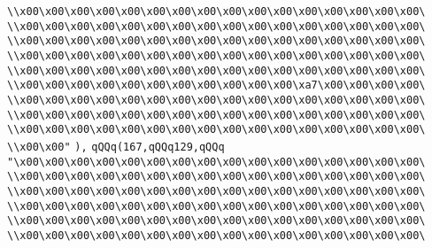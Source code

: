 \verb|\\x00\x00\x00\x00\x00\x00\x00\x00\x00\x00\x00\x00\x00\x00\x00\x00\|\newline
\verb|\\x00\x00\x00\x00\x00\x00\x00\x00\x00\x00\x00\x00\x00\x00\x00\x00\|\newline
\verb|\\x00\x00\x00\x00\x00\x00\x00\x00\x00\x00\x00\x00\x00\x00\x00\x00\|\newline
\verb|\\x00\x00\x00\x00\x00\x00\x00\x00\x00\x00\x00\x00\x00\x00\x00\x00\|\newline
\verb|\\x00\x00\x00\x00\x00\x00\x00\x00\x00\x00\x00\x00\x00\x00\x00\x00\|\newline
\verb|\\x00\x00\x00\x00\x00\x00\x00\x00\x00\x00\x00\xa7\x00\x00\x00\x00\|\newline
\verb|\\x00\x00\x00\x00\x00\x00\x00\x00\x00\x00\x00\x00\x00\x00\x00\x00\|\newline
\verb|\\x00\x00\x00\x00\x00\x00\x00\x00\x00\x00\x00\x00\x00\x00\x00\x00\|\newline
\verb|\\x00\x00\x00\x00\x00\x00\x00\x00\x00\x00\x00\x00\x00\x00\x00\x00\|\newline
\verb|\\x00\x00"|\newline
\verb|),|\newline
\verb|qQQq(167,qQQq129,qQQq|\newline
\verb|"\x00\x00\x00\x00\x00\x00\x00\x00\x00\x00\x00\x00\x00\x00\x00\x00\|\newline
\verb|\\x00\x00\x00\x00\x00\x00\x00\x00\x00\x00\x00\x00\x00\x00\x00\x00\|\newline
\verb|\\x00\x00\x00\x00\x00\x00\x00\x00\x00\x00\x00\x00\x00\x00\x00\x00\|\newline
\verb|\\x00\x00\x00\x00\x00\x00\x00\x00\x00\x00\x00\x00\x00\x00\x00\x00\|\newline
\verb|\\x00\x00\x00\x00\x00\x00\x00\x00\x00\x00\x00\x00\x00\x00\x00\x00\|\newline
\verb|\\x00\x00\x00\x00\x00\x00\x00\x00\x00\x00\x00\x00\x00\x00\x00\x00\|\newline
